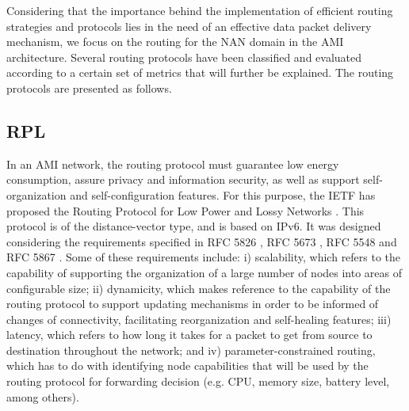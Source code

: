 \documentclass[10pt,twocolumn,twoside,submit]{JCNtran}
\begin{document}
Considering that the importance behind the implementation of efficient routing strategies and protocols lies in the need of an effective data packet delivery mechanism, we focus on the routing for the NAN domain in the AMI architecture. %
Several routing protocols have been classified and evaluated according to a certain set of metrics \cite{Sabbah2014} that will further be explained. The routing protocols are presented as follows.

\subsection{RPL}\label{rpl}

In an AMI network, the routing protocol must guarantee low energy consumption, assure privacy and information security, as well as support self-organization and self-configuration features. For this purpose, the IETF has proposed the Routing Protocol for Low Power and Lossy Networks \cite{Winter2012}. This protocol is of the distance-vector type, and is based on IPv6. It was designed considering the requirements specified in RFC 5826 \cite{Brandt2010}, RFC 5673 \cite{Pister2009}, RFC 5548 \cite{Dohler2009} and RFC 5867 \cite{Martocci2010}. Some of these requirements include: i) scalability, which refers to the capability of supporting the organization of a large number of nodes into areas of configurable size; ii) dynamicity, which makes reference to the capability of the routing protocol to support updating mechanisms in order to be informed of changes of connectivity, facilitating reorganization and self-healing features; iii) latency, which refers to how long it takes for a packet to get from source to destination throughout the network; and iv) parameter-constrained routing, which has to do with identifying node capabilities that will be used by the routing protocol for forwarding decision (e.g. CPU, memory size, battery level, among others).
\end{document}

